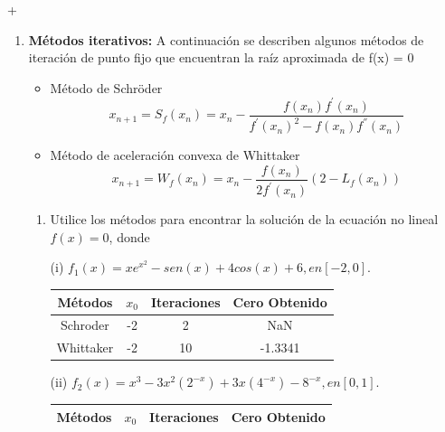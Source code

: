 +\documentclass{udpreport}
\begin{document}
\begin{enumerate}
\begin{enumerate}
\end{enumerate}
\newpage

\item {\bf Métodos iterativos:} A continuación se describen algunos métodos de iteración de punto fijo que encuentran la raíz aproximada de f(x) = 0
\begin{itemize}
       
        
        \item Método de Schröder
            \begin{equation*}
                x_{n+1}=S_f(x_n)=x_n-\frac{f(x_n)f^{'}(x_n)}{f^{'}(x_n)^{2}-f(x_n)f^{''}(x_n)}
            \end{equation*}
        
        \item Método de aceleración convexa de Whittaker
            \begin{equation*}
                x_{n+1}=W_f(x_n)=x_n - \frac{f(x_n)}{2f^{'}(x_n)}(2 - L_f(x_n))
            \end{equation*}
        
\end{itemize}
	\begin{enumerate}
	
		\item Utilice los métodos para encontrar la solución de la ecuación no lineal $f(x)=0$, donde
		
		(i) $f_{1}(x)=xe^{x^2}-sen(x)+4cos(x)+6, en [-2,0].$
		
		\begin{table}[H]
			\centering
			\begin{tabular}{|c|c|c|c|}
				\hline
				Métodos & $x_{0}$ & Iteraciones & Cero Obtenido \\
				
				\hline
				Schroder & -2 & 2 & NaN \\
				\hline
				Whittaker & -2 & 10 & -1.3341 \\
				\hline				
			\end{tabular}
			\end{table}	
		
		
		
		(ii) $f_{2}(x)=x^3-3x^2(2^{-x})+3x(4^{-x})-8^{-x}, en [0,1].$
		
			\begin{table}[H]
			\centering
			\begin{tabular}{|c|c|c|c|}
				\hline
				Métodos & $x_{0}$ & Iteraciones & Cero Obtenido \\
				\hline
			

\end{tabular}
\end{table}
\end{enumerate}
\end{enumerate}
\end{document}
